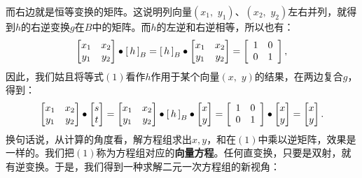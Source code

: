 \documentclass[12pt,UTF8,fontset=none]{ctexbook}
\begin{document}
而右边就是恒等变换的矩阵。这说明列向量$(x_1,\,\,y_1)$、$(x_2,\,\,y_2)$左右并列，就得到$h$的右逆变换$g$在$B$中的矩阵。而$h$的左逆和右逆相等，所以也有：
$$
\begin{bmatrix}
    x_1&x_2\\y_1&y_2
\end{bmatrix}\bullet\bmat{h}[B]=\bmat{h}[B]\bullet \begin{bmatrix}
    x_1&x_2\\y_1&y_2
\end{bmatrix}=\begin{bmatrix}
    \phantom{0}1&0\phantom{0}\\\phantom{0}0&1\phantom{0}
\end{bmatrix},
$$
因此，我们姑且将等式$(1)$看作$h$作用于某个向量$(x,\,\,y)$的结果，在两边复合$g$，得到：
$$
\begin{bmatrix}
    x_1&x_2\\y_1&y_2
\end{bmatrix}\bullet\begin{bmatrix}
    s\\t
\end{bmatrix} = \begin{bmatrix}
    x_1&x_2\\y_1&y_2
\end{bmatrix}\bullet\bmat{h}[B]\bullet \begin{bmatrix}
    x\\y
\end{bmatrix} = \begin{bmatrix}
    \phantom{0}1&0\phantom{0}\\\phantom{0}0&1\phantom{0}
\end{bmatrix}\bullet \begin{bmatrix}
    x\\y
\end{bmatrix} = \begin{bmatrix}
    x\\y
\end{bmatrix}.
$$
换句话说，从计算的角度看，解方程组求出$x,y$，和在$(1)$中乘以逆矩阵，效果是一样的。我们把$(1)$称为方程组对应的\textbf{向量方程}。任何直变换，只要是双射，就有逆变换。于是，我们得到一种求解二元一次方程组的新视角：

\begin{center}
\end{center}
\end{document}
